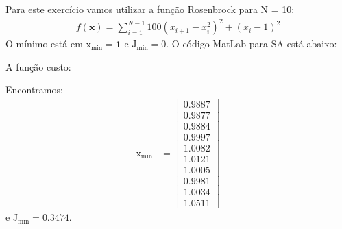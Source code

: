 \documentclass[12pt]{article}
\newenvironment{exercise}[2][Exercício]{\begin{trivlist}
\item[\hskip \labelsep {\bfseries #1}\hskip \labelsep {\bfseries #2.}]}{\end{trivlist}}
\begin{document}
\begin{exercise}{3}
Para este exercício vamos utilizar a função Rosenbrock para N = 10:
\begin{align*}
f(\textbf{x}) = \sum_{i=1}^{N-1} 100(x_{i+1}-x_i^2)^2 + (x_i-1)^2
\end{align*}
O mínimo está em $\text{x}_\text{min}= \textbf{1}$ e $\text{J}_\text{min} =
0$. 
O código MatLab para SA está abaixo:


A função custo:


Encontramos:
\begin{align*}
\text{x}_\text{min} &= \begin{bmatrix}
0.9887 \\ 0.9877 \\ 0.9884 \\ 0.9997 \\ 1.0082 \\ 1.0121 \\ 1.0005 \\ 0.9981
\\ 1.0034 \\ 1.0511
\end{bmatrix}
\end{align*}
e $\text{J}_\text{min} = 0.3474$.


\end{exercise}
\end{document}
